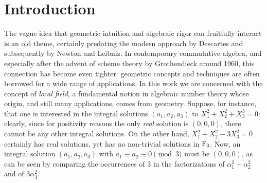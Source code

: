 \documentclass[sigplan,10pt,anonymous,review]{acmart}
\begin{document}
\section{Introduction}\label{sec:intro}
The vague idea that geometric intuition and algebraic rigor can fruitfully interact is an old theme, certainly predating the modern approach by Descartes and subsequently by Newton and Leibniz. 
In contemporary commutative algebra, and especially
after the advent of scheme theory by Grothendieck around 1960, this connection has become even tighter: geometric concepts and techniques are often borrowed for a wide range of applications. In this work we are concerned with the concept of \emph{local field}, a fundamental notion in algebraic number theory whose origin, and still many applications, comes from geometry. 
Suppose, for instance, that one is interested in the integral solutions $(a_1,a_2,a_3)$ to $X_1^2+X_2^2+X_3^3=0$: clearly, since for positivity reasons the only \emph{real} solution is $(0,0,0)$, there cannot be any other integral solutions. On the other hand, $X_1^2+ X_2^2-3X_3^2=0$ certainly has real solutions, yet has no non-trivial solutions in $\FF[3]$. Now, an integral solution $(a_1,a_2,a_3)$ with $a_1\equiv a_2\equiv 0\pmod{3}$ must be $(0,0,0)$, as can be seen by comparing the occurrences of $3$ in the factorizations of $\alpha_1^2+\alpha_2^2$ and of $3\alpha_3^2$. 
\end{document}

